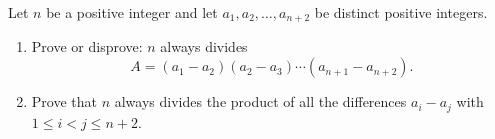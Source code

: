 Let $n$ be a positive integer and let $a_1,a_2,\dots,a_{n+2}$ be distinct positive integers.
\begin{enumerate}
\item[(a)] Prove or disprove: $n$ always divides
\[A=(a_1-a_2)(a_2-a_3)\cdots(a_{n+1}-a_{n+2}).\]
\item[(b)] Prove that $n$ always divides the product of all the differences $a_i-a_j$ with $1\le i<j\le n+2$.
\end{enumerate}
